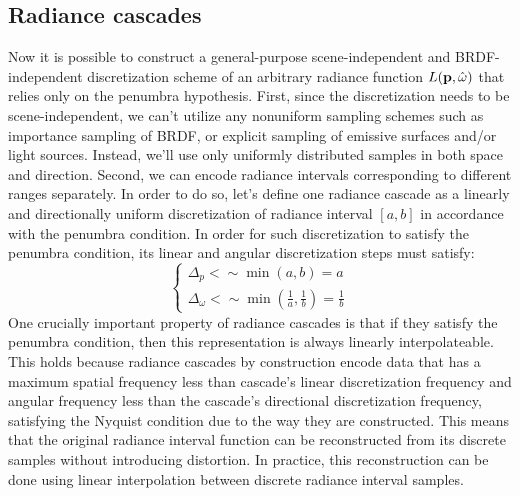 \documentclass{jcgt}
\begin{document}


\subsection{Radiance cascades}
\label{sec:radiance_cascades}
Now it is possible to construct a general-purpose scene-independent and BRDF-independent discretization scheme of an arbitrary radiance function $L(\textbf p, \hat \omega)$ that relies only on the penumbra hypothesis.
First, since the discretization needs to be scene-independent, we can't utilize any nonuniform sampling schemes such as importance sampling of BRDF, or explicit sampling of emissive surfaces and/or light sources.
Instead, we'll use only uniformly distributed samples in both space and direction. Second, we can encode radiance intervals corresponding to different ranges separately. In order to do so, let's define one radiance cascade as a linearly and directionally uniform discretization of radiance interval $[a, b]$ in accordance with the penumbra condition.
In order for such discretization to satisfy the penumbra condition, its linear and angular discretization steps must satisfy:
\begin{equation}
  \begin{cases}
    \Delta_p<\sim\min(a, b)=a \\
    \Delta_\omega<\sim \min(\frac{1}{a}, \frac{1}{b})=\frac{1}{b}
    \label{eq:interval_ranges}
  \end{cases}
\end{equation}
\label{interpolateability}
One crucially important property of radiance cascades is that if they satisfy the penumbra condition, then this representation is always linearly interpolateable. This holds because radiance cascades by construction encode data that has a maximum spatial frequency less than cascade's linear discretization frequency and angular frequency less than the cascade's directional discretization frequency, satisfying the Nyquist condition due to the way they are constructed. This means that the original radiance interval function can be reconstructed from its discrete samples without introducing distortion. In practice, this reconstruction can be done using linear interpolation between discrete radiance interval samples.
\end{document}

